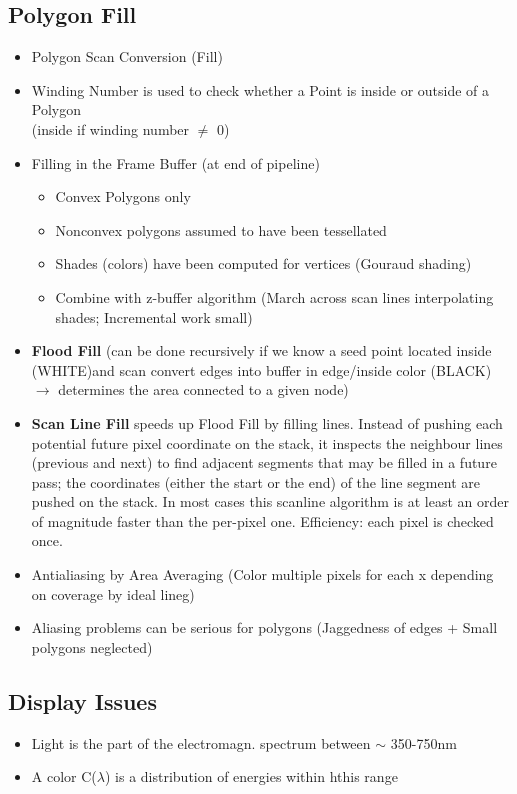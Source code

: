 \documentclass[11pt,a4paper]{article}
\begin{document}
	\subsection{Polygon Fill}
		\begin{itemize}
			\item Polygon Scan Conversion (Fill)
			\item Winding Number is used to check whether a Point is inside or outside of a Polygon\\
				(inside if winding number $\ne$ 0)
			\item Filling in the Frame Buffer (at end of pipeline)
				\begin{itemize}
					\item Convex Polygons only
					\item Nonconvex polygons assumed to have been tessellated
					\item Shades (colors) have been computed for vertices (Gouraud shading)
					\item Combine with z-buffer algorithm (March across scan lines interpolating shades; Incremental work small)
				\end{itemize}
			\item \textbf{Flood Fill} (can be done recursively if we know a seed point located inside (WHITE)and scan convert edges into buffer in edge/inside color
			(BLACK) $\rightarrow$ determines the area connected to a given node)
			\item \textbf{Scan Line Fill} speeds up Flood Fill by filling lines. Instead of pushing each potential future pixel coordinate on the stack, it inspects the neighbour lines (previous and next) to find adjacent segments that may be filled in a future pass; the coordinates (either the start or the end) of the line segment are pushed on the stack. In most cases this scanline algorithm is at least an order of magnitude faster than the per-pixel one.
			Efficiency: each pixel is checked once.
			\item Antialiasing by Area Averaging (Color multiple pixels for each x depending on coverage by ideal lineg)
			\item Aliasing problems can be serious for polygons (Jaggedness of edges + Small polygons neglected)
		\end{itemize}
	\subsection{Display Issues}
		\begin{itemize}
			\item Light is the part of the electromagn. spectrum between $\sim$ 350-750nm	
			\item A color C($\lambda$) is a distribution of energies within hthis range	
			

			

		\end{itemize}
	
\end{document}
